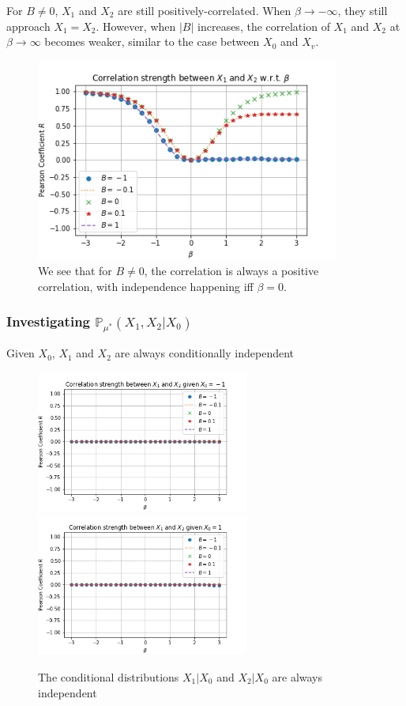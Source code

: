 \documentclass[12pt]{article}
\numberwithin{equation}{section}
\begin{document}
For $B\neq 0$, $X_1$ and $X_2$ are still positively-correlated. When $\beta\rightarrow-\infty$, they still approach $X_1=X_2$. However, when
$|B|$ increases, the correlation of $X_1$ and $X_2$ at $\beta\rightarrow\infty$
becomes weaker, similar to the case between $X_0$ and $X_v$.
\begin{figure}[h]
    \centering
    \includegraphics[width=10cm]{img/ising_x1_x2_pearson.png}
    \caption{We see that for $B\neq 0$, the correlation is always a positive correlation, with independence happening iff $\beta=0$.}
    \label{Fig.ising-x1-x2-B}
\end{figure}

\subsubsection{Investigating $\mathbb{P}_{\mu^*}(X_1, X_2|X_0)$}

Given $X_0$, $X_1$ and $X_2$ are always conditionally independent

\begin{figure}[h]
    \centering
    \includegraphics[width=7cm]{img/ising_x1_x2_pearson_x0=-1.png}
    \quad
    \includegraphics[width=7cm]{img/ising_x1_x2_pearson_x0=1.png}
    \caption{The conditional distributions $X_1|X_0$ and $X_2|X_0$ are always independent}
    \label{Fig.ising-x1-x2-given-x0-B}
\end{figure}
\end{document}
